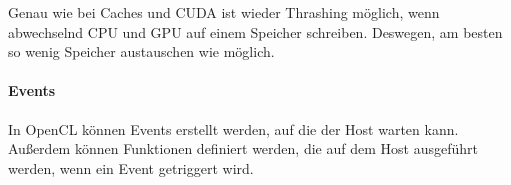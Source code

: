 Genau wie bei Caches und CUDA ist wieder Thrashing möglich, wenn abwechselnd CPU und GPU auf einem Speicher schreiben.
Deswegen, am besten so wenig Speicher austauschen wie möglich.

\paragraph{Events}
In OpenCL können Events erstellt werden, auf die der Host warten kann.
Außerdem können Funktionen definiert werden, die auf dem Host ausgeführt werden, wenn ein Event getriggert wird.
